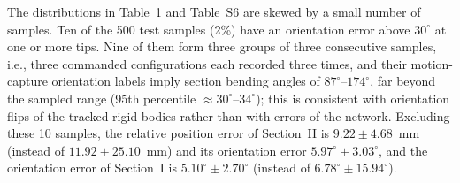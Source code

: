 The distributions in Table~1 and Table~S6 are skewed by a small number of samples. Ten of the 500 test samples (2\%) have an orientation error above $30^\circ$ at one or more tips. Nine of them form three groups of three consecutive samples, i.e., three commanded configurations each recorded three times, and their motion-capture orientation labels imply section bending angles of $87^\circ$--$174^\circ$, far beyond the sampled range (95th percentile $\approx 30^\circ$--$34^\circ$); this is consistent with orientation flips of the tracked rigid bodies rather than with errors of the network. Excluding these 10 samples, the relative position error of Section~II is $9.22 \pm 4.68$~mm (instead of $11.92 \pm 25.10$~mm) and its orientation error $5.97^\circ \pm 3.03^\circ$, and the orientation error of Section~I is $5.10^\circ \pm 2.70^\circ$ (instead of $6.78^\circ \pm 15.94^\circ$).
